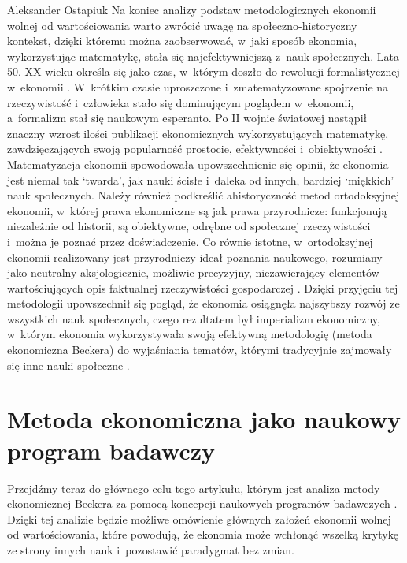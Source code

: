 \begin{artplenv}{Aleksander Ostapiuk}
Na koniec analizy podstaw metodologicznych ekonomii wolnej od wartościowania warto zwrócić uwagę na
społeczno-historyczny kontekst, dzięki któremu można zaobserwować, w~jaki sposób ekonomia, wykorzystując matematykę,
stała się najefektywniejszą z~nauk społecznych. Lata 50. XX wieku określa się jako czas, w~którym doszło do rewolucji
formalistycznej w~ekonomii
\parencite{blaug_formalist_2003}.
W~krótkim czasie uproszczone i~zmatematyzowane
spojrzenie na rzeczywistość i~człowieka stało się dominującym poglądem w~ekonomii, a~formalizm stał się naukowym
esperanto. Po II wojnie światowej nastąpił znaczny wzrost ilości publikacji ekonomicznych wykorzystujących matematykę,
zawdzięczających swoją popularność prostocie, efektywności i~obiektywności
\parencite{debreu_mathematization_1991}.
Matematyzacja ekonomii spowodowała upowszechnienie się opinii, że ekonomia jest niemal tak `twarda', jak nauki
ścisłe i~daleka od innych, bardziej `miękkich' nauk społecznych.
Należy również podkreślić ahistoryczność metod ortodoksyjnej
ekonomii, w~której prawa ekonomiczne są jak prawa przyrodnicze: funkcjonują niezależnie od historii, są obiektywne,
odrębne od społecznej rzeczywistości i~można je poznać przez doświadczenie. Co równie istotne, w~ortodoksyjnej ekonomii
realizowany jest przyrodniczy ideał poznania naukowego, rozumiany jako neutralny aksjologicznie, możliwie precyzyjny,
niezawierający elementów wartościujących opis faktualnej rzeczywistości gospodarczej
\parencite[zob.][]{zboron_dyskurs_2013}.
Dzięki przyjęciu tej metodologii upowszechnił się pogląd, że ekonomia osiągnęła najszybszy rozwój ze
wszystkich nauk społecznych, czego rezultatem był imperializm ekonomiczny, w~którym ekonomia wykorzystywała swoją
efektywną metodologię (metoda ekonomiczna Beckera) do wyjaśniania tematów, którymi tradycyjnie zajmowały się inne nauki
społeczne
\parencite{lazear_economic_2000,maki_economics_2009,maki_scientific_2017}.

\section{Metoda ekonomiczna jako naukowy program badawczy}
Przejdźmy teraz do głównego celu tego artykułu, którym jest analiza metody ekonomicznej Beckera za pomocą koncepcji
naukowych programów badawczych
\parencite{lakatos_methodology_1980}.
Dzięki tej analizie będzie możliwe omówienie
głównych założeń ekonomii wolnej od wartościowania, które powodują, że ekonomia może wchłonąć wszelką krytykę ze strony
innych nauk i~pozostawić paradygmat bez zmian. 


\end{artplenv}
